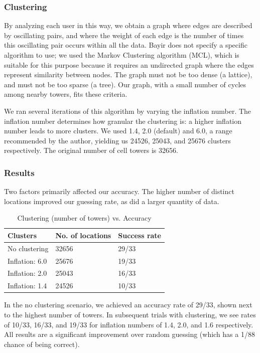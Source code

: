 \documentclass[pageno]{jpaper}
\begin{document}
\subsubsection{Clustering}
By analyzing each user in this way, we obtain a graph where edges are described by oscillating pairs, and where the weight of each edge is the number of times this oscillating pair occurs within all the data. Bayir does not specify a specific algorithm to use; we used the Markov Clustering algorithm (MCL), which is suitable for this purpose because it requires an undirected graph where the edges represent similarity between nodes. The graph must not be too dense (a lattice), and must not be too sparse (a tree). Our graph, with a small number of cycles among nearby towers, fits these criteria. 

We ran several iterations of this algorithm by varying the inflation number. The inflation number determines how granular the clustering is: a higher inflation number leads to more clusters. We used 1.4, 2.0 (default) and 6.0, a range recommended by the author, yielding us 24526, 25043,  and 25676 clusters respectively. The original number of cell towers is 32656.

\subsubsection{Results}

Two factors primarily affected our accuracy. The higher number of distinct locations improved our guessing rate, as did a larger quantity of data. 


\begin{table}[h!]
  \centering
  \begin{tabular}{|l|l|l|}
    \hline
    \textbf{Clusters} & \textbf{No. of locations} & \textbf{Success rate}\\
    \hline
    \hline
    No clustering & 32656 & 29/33\\
    \hline
    Inflation: 6.0 & 25676 & 19/33\\
    \hline
    Inflation: 2.0 &  25043 & 16/33\\
    \hline
    Inflation: 1.4 & 24526 & 10/33\\ 
    \hline
  \end{tabular}
  \caption{Clustering (number of towers) vs. Accuracy}
  \label{table:formatting}
\end{table}

In the no clustering scenario, we achieved an accuracy rate of 29/33, shown next to the highest number of towers. In subsequent trials with clustering, we see rates of 10/33, 16/33, and 19/33 for inflation numbers of 1.4, 2.0, and 1.6 respectively. All results are a significant improvement over random guessing (which has a 1/88 chance of being correct). 
\end{document}

